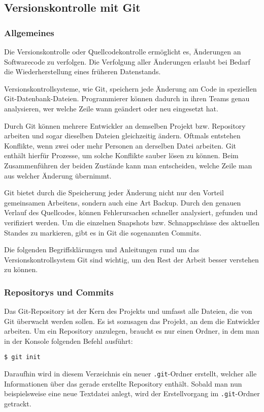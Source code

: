 \subsection{Versionskontrolle mit Git}
\subsubsection{Allgemeines}
Die Versionskontrolle oder Quellcodekontrolle ermöglicht es, Änderungen an
Softwarecode zu verfolgen. Die Verfolgung aller Änderungen erlaubt bei Bedarf
die Wiederherstellung eines früheren Datenstands. \parencite{git-allgemein}

Versionskontrollsysteme, wie Git, speichern jede Änderung am Code in speziellen
Git-Datenbank-Dateien. Programmierer können dadurch in ihren Teams genau
analysieren, wer welche Zeile wann geändert oder neu eingesetzt hat.

Durch Git können mehrere Entwickler an demselben Projekt bzw. Repository
arbeiten und sogar dieselben Dateien gleichzeitig ändern. Oftmals entstehen
Konflikte, wenn zwei oder mehr Personen an derselben Datei arbeiten. Git enthält
hierfür Prozesse, um solche Konflikte sauber lösen zu können. Beim
Zusammenführen der beiden Zustände kann man entscheiden, welche Zeile man aus
welcher Änderung übernimmt.

Git bietet durch die Speicherung jeder Änderung nicht nur den Vorteil
gemeinsamen Arbeitens, sondern auch eine Art \glqq Backup\grqq{}. Durch den
genauen Verlauf des Quellcodes, können Fehlerursachen schneller analysiert,
gefunden und verifiziert werden. Um die einzelnen Snap\-shots bzw.
Schnappschüsse des aktuellen Standes zu markieren, gibt es in Git die
sogenannten Commits.

\newpage

Die folgenden Begriffsklärungen und Anleitungen rund um das
Versionskontrollsystem Git sind wichtig, um den Rest der Arbeit besser verstehen
zu können.

\subsubsection{Repositorys und Commits}
Das Git-Repository ist der Kern des Projekts und umfasst alle Dateien, die von
Git überwacht werden sollen. Es ist sozusagen das Projekt, an dem die Entwickler
arbeiten. Um ein Repository anzulegen, braucht es nur einen Ordner, in dem man
in der Konsole folgenden Befehl ausführt:
\begin{lstlisting}[style=Bash]
$ git init
\end{lstlisting}
Daraufhin wird in diesem Verzeichnis ein neuer \texttt{.git}-Ordner erstellt,
welcher alle Informationen über das gerade erstellte Repository enthält. Sobald
man nun beispielsweise eine neue Textdatei anlegt, wird der Erstellvorgang im
\texttt{.git}-Ordner getrackt.

